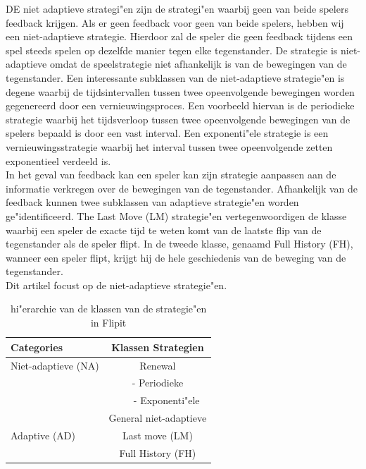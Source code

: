 \documentclass[master=cws, masteroption=vs,english]{kulemt}
\begin{document}
\begin{abstract*}
DE niet adaptieve strategi"en zijn de strategi"en waarbij geen van beide spelers feedback krijgen. 
Als er geen feedback voor geen van beide spelers, hebben wij een niet-adaptieve strategie. Hierdoor zal de speler die geen feedback tijdens een spel steeds spelen op dezelfde manier tegen elke tegenstander. De strategie is niet-adaptieve omdat de speelstrategie niet afhankelijk is van de bewegingen van de tegenstander. Een interessante subklassen van de niet-adaptieve strategie"en is degene waarbij de tijdsintervallen tussen twee opeenvolgende bewegingen worden gegenereerd door een vernieuwingsproces. Een voorbeeld hiervan is de periodieke strategie waarbij het tijdsverloop tussen twee opeenvolgende bewegingen van de spelers bepaald is door een vast interval. Een exponenti"ele strategie is een vernieuwingsstrategie waarbij het interval tussen twee opeenvolgende zetten exponentieel verdeeld is. \\

In het geval van feedback kan een speler kan zijn strategie aanpassen aan de informatie verkregen over de bewegingen van de tegenstander. Afhankelijk van de feedback kunnen twee subklassen van adaptieve strategie"en worden ge"identificeerd. The Last Move (LM) strategie"en vertegenwoordigen de klasse waarbij een speler de exacte tijd te weten komt van de laatste flip van de tegenstander als de speler flipt. In de tweede klasse, genaamd Full History (FH), wanneer een speler flipt, krijgt hij de hele geschiedenis van de beweging van de tegenstander. \\
Dit artikel focust op de niet-adaptieve strategie"en.  \\


 \begin{table}
 \center
 \begin {tabular} {l | c}
  \textbf{Categories} & \textbf{Klassen Strategien} \\
  \hline Niet-adaptieve (NA) & Renewal \\
  & - Periodieke \\
  & ~~~ - Exponenti"ele \\
  & General niet-adaptieve \\
  \hline Adaptive (AD) & Last move (LM) \\
  & Full History (FH) \\
\end{tabular}
 \caption{hi"erarchie van de klassen van de strategie"en in Flipit}
 \label{tabel: Strategies}
 \end{table}



\end{abstract*}
\end{document}
